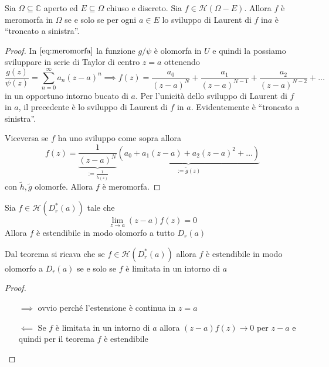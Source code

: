 \begin{proposition}
    Sia \(\Omega \subseteq  \mathbb{C}\) aperto ed \(E \subseteq \Omega \)
    chiuso e discreto. Sia \(f \in \mathcal{H}{(\Omega - E)}\). Allora \(f\) è
    meromorfa in \(\Omega\) se e solo se per ogni \(a \in E\) lo sviluppo di
    Laurent di \(f\) in\(a\) è ``troncato a sinistra''.
\end{proposition}
\begin{proof}
In \(\eqref{eq:meromorfa}\) la funzione \(g / \psi\) è olomorfa in \(U\) e
quindi la possiamo sviluppare in serie di Taylor di centro \(z=a\) ottenendo
\[
    \frac{g{(z)}}{\psi {(z)}} = \sum_{n=0}^{\infty} a_{n} {(z-a)}^{n} \implies
    f{(z)} = \frac{a_{0}}{{(z-a)}^{N}} + \frac{a_{1}}{{(z-a)}^{N-1}} +
    \frac{a_{2}}{{(z-a)}^{N-2}} + \dots
\]
in un opportuno intorno bucato di \(a\). Per l'unicità dello sviluppo di Laurent
di \(f\) in \(a\), il precedente è lo sviluppo di Laurent di \(f\) in \(a\).
Evidentemente è ``troncato a sinistra''.

Viceversa se \(f\) ha uno sviluppo come sopra allora
\[
    f{(z)} = \underbrace{\frac{1}{{(z-a)}^{N}}}_{:= \frac{1}{\tilde{h}{(z)}}}
    \underbrace{\left( a_{0} + a_{1}{(z-a)} + a_{2}{(z-a)}^2 +
    \dots\right)}_{:=\tilde{g}{(z)}} 
\]
con \(\tilde{h}, \tilde{g}\) olomorfe. Allora \(f\) è meromorfa.
\end{proof}
\begin{theorem}\label{thm:estensione-riemann}
    Sia \(f \in \mathcal{H}{(D^{*}_r{(a)})}\) tale che 
\[
    \lim_{z \to a} {(z-a)}f{(z)} = 0
\]
    Allora \(f\) è estendibile in modo olomorfo a tutto \(D_r{(a)}\) 
\end{theorem}
\begin{corollary}
    Dal teorema si ricava che se \(f \in \mathcal{H}{(D^{*}_r{(a)})}\) allora
    \(f\) è estendibile in modo olomorfo a \(D_r{(a)}\) se e solo se \(f\)
    è limitata in un intorno di \(a\) 
\end{corollary}
\begin{proof}\( \)
\begin{itemize}
    \item[\(\implies \)] ovvio perché l'estensione è continua in \(z=a\) 
    \item[\(\impliedby \)] Se \(f\) è limitata in un intorno di \(a\) allora
        \({(z-a)}f{(z)} \to 0\) per \(z-a\) e quindi per il teorema \(f\) è
        estendibile
\end{itemize}
\end{proof}


